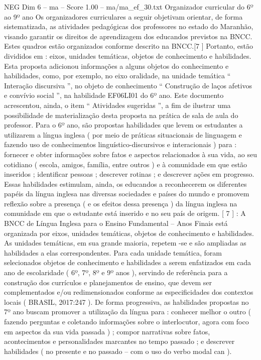 \begin{textsample}{NEG Dim 6 – ma – Score 1.00 – ma/ma\_ef\_30.txt}  \label{ex:f6_neg_199}
Organizador curricular do 6º ao 9º ano Os organizadores curriculares a seguir objetivam orientar, de forma sistematizada, as atividades pedagógicas dos professores no estado do Maranhão, visando garantir os direitos de aprendizagem dos educandos previstos na BNCC.
Estes quadros estão organizados conforme descrito na BNCC.[7 ] Portanto, estão divididos em : eixos, unidades temáticas, objetos de conhecimento e habilidades.
Esta proposta adicionou informações a alguns objetos do conhecimento e habilidades, como, por exemplo, no eixo oralidade, na unidade temática “ Interação discursiva ”, no objeto de conhecimento “ Construção de laços afetivos e convívio social ”, na habilidade EF06LI01 do 6º ano.
Este documento acrescentou, ainda, o item “ Atividades sugeridas ”, a fim de ilustrar uma possibilidade de materialização desta proposta na prática de sala de aula do professor.
Para o 6º ano, são propostas habilidades que levem os estudantes a utilizarem a língua inglesa ( por meio de práticas situacionais de linguagem e fazendo uso de conhecimentos linguístico-discursivos e interacionais ) para : fornecer e obter informações sobre fatos e aspectos relacionados à sua vida, ao seu cotidiano ( escola, amigos, família, entre outros ) e à comunidade em que estão inseridos ; identificar pessoas ; descrever rotinas ; e descrever ações em progresso.
Essas habilidades estimulam, ainda, os educandos a reconhecerem os diferentes papéis da língua inglesa nas diversas sociedades e países do mundo e promovem reflexão sobre a presença ( e os efeitos dessa presença ) da língua inglesa na comunidade em que o estudante está inserido e no seu país de origem. [ 7 ] : A BNCC de Língua Inglesa para o Ensino Fundamental – Anos Finais está organizada por eixos, unidades temáticas, objetos de conhecimento e habilidades.
As unidades temáticas, em sua grande maioria, repetem -se e são ampliadas as habilidades a elas correspondentes.
Para cada unidade temática, foram selecionados objetos de conhecimento e habilidades a serem enfatizados em cada ano de escolaridade ( 6º, 7º, 8º e 9º anos ), servindo de referência para a construção dos currículos e planejamentos de ensino, que devem ser complementados e/ou redimensionados conforme as especificidades dos contextos locais ( BRASIL, 2017:247 ).
De forma progressiva, as habilidades propostas no 7º ano buscam promover a utilização da língua para : conhecer melhor o outro ( fazendo perguntas e coletando informações sobre o interlocutor, agora com foco em aspectos da sua vida passada ) ; compor narrativas sobre fatos, acontecimentos e personalidades marcantes no tempo passado ; e descrever habilidades ( no presente e no passado – com o uso do verbo modal can ).

\end{textsample}
